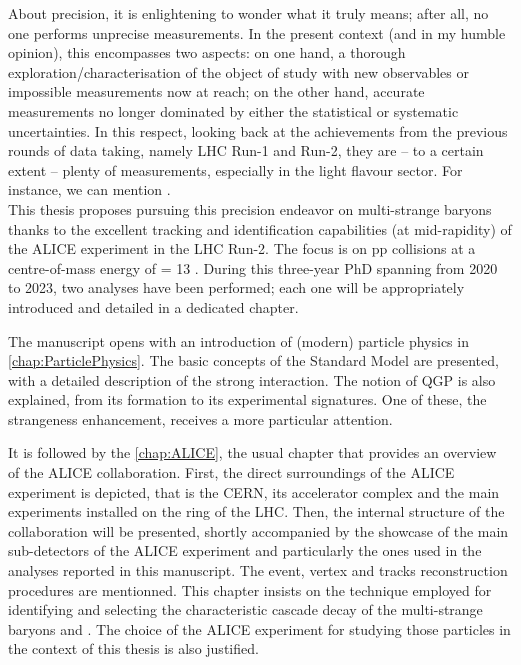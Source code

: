 About precision, it is enlightening to wonder what it truly means; after all, no one performs unprecise measurements. In the present context (and in my humble opinion), this encompasses two aspects: on one hand, a thorough exploration/characterisation of the object of study with new observables or impossible measurements now at reach; on the other hand, accurate measurements no longer dominated by either the statistical or systematic uncertainties.
In this respect, looking back at the achievements from the previous rounds of data taking, namely LHC Run-1 and Run-2, they are -- to a certain extent -- plenty of measurements, especially in the light flavour sector. For instance, we can mention \cite{alicecollaborationCharacterizingInitialConditions2022}\cite{schotterMultidifferentialInvestigationStrangeness2023}\cite{schotterQCDLHC2022}.\\

This thesis proposes pursuing this precision endeavor on multi-strange baryons thanks to the excellent tracking and identification capabilities (at mid-rapidity) of the ALICE experiment in the LHC Run-2. The focus is on pp collisions at a centre-of-mass energy of \sqrtS = 13 \tev. During this three-year PhD spanning from 2020 to 2023, two analyses have been performed; each one will be appropriately introduced and detailed in a dedicated chapter.

The manuscript opens with an introduction of (modern) particle physics in \chap\ref{chap:ParticlePhysics}. The basic concepts of the Standard Model are presented, with a detailed description of the strong interaction. The notion of QGP is also explained, from its formation to its experimental signatures. One of these, the strangeness enhancement, receives a more particular attention.

It is followed by the \chap\ref{chap:ALICE}, the usual chapter that provides an overview of the ALICE collaboration. First, the direct surroundings of the ALICE experiment is depicted, that is the CERN, its accelerator complex and the main experiments installed on the ring of the LHC. Then, the internal structure of the collaboration will be presented, shortly accompanied by the showcase of the main sub-detectors of the ALICE experiment and particularly the ones used in the analyses reported in this manuscript. The event, vertex and tracks reconstruction procedures are mentionned. This chapter insists on the technique employed for identifying and selecting the characteristic cascade decay of the multi-strange baryons \rmXi and \rmOmega. The choice of the ALICE experiment for studying those particles in the context of this thesis is also justified.

